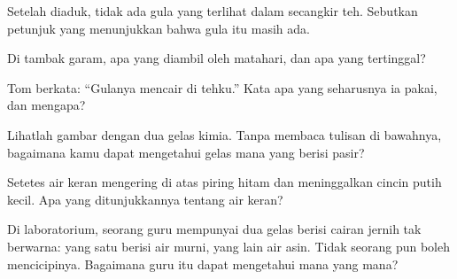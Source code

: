 \begin{exercise}[$\star$]\label{exo:g2:mixing-and-dissolving:6}
Setelah diaduk, tidak ada gula yang terlihat dalam secangkir teh.
Sebutkan petunjuk yang menunjukkan bahwa gula itu masih ada.
\end{exercise}

\begin{exercise}[$\star$]\label{exo:g2:mixing-and-dissolving:7}
Di tambak garam, apa yang diambil oleh matahari, dan apa yang
tertinggal?
\end{exercise}

\begin{exercise}[$\star$]\label{exo:g2:mixing-and-dissolving:8}
Tom berkata: ``Gulanya mencair di tehku.'' Kata apa yang seharusnya ia
pakai, dan mengapa?
\end{exercise}

\begin{exercise}[$\star\star$]\label{exo:g2:mixing-and-dissolving:9}
Lihatlah gambar dengan dua gelas kimia. Tanpa membaca tulisan di
bawahnya, bagaimana kamu dapat mengetahui gelas mana yang berisi pasir?
\end{exercise}

\begin{exercise}[$\star\star$]\label{exo:g2:mixing-and-dissolving:10}
Setetes air keran mengering di atas piring hitam dan meninggalkan
cincin putih kecil. Apa yang ditunjukkannya tentang air keran?
\end{exercise}

\begin{exercise}[$\star\star$]\label{exo:g2:mixing-and-dissolving:11}
Di laboratorium, seorang guru mempunyai dua gelas berisi cairan jernih
tak berwarna: yang satu berisi air murni, yang lain air asin. Tidak
seorang pun boleh mencicipinya. Bagaimana guru itu dapat mengetahui
mana yang mana?
\end{exercise}
